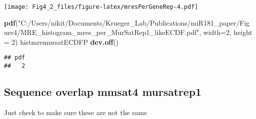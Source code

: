 \documentclass[
]{article}
\newenvironment{Shaded}{\begin{snugshade}}{\end{snugshade}}
\newcommand{\AttributeTok}[1]{\textcolor[rgb]{0.13,0.29,0.53}{#1}}
\newcommand{\DecValTok}[1]{\textcolor[rgb]{0.00,0.00,0.81}{#1}}
\newcommand{\FunctionTok}[1]{\textcolor[rgb]{0.13,0.29,0.53}{\textbf{#1}}}
\newcommand{\NormalTok}[1]{#1}
\newcommand{\StringTok}[1]{\textcolor[rgb]{0.31,0.60,0.02}{#1}}
\begin{document}
\texttt{[image: Fig4\_2\_files/figure-latex/mresPerGeneRep-4.pdf]}

\begin{Shaded}
\begin{Highlighting}[]
\FunctionTok{pdf}\NormalTok{(}\StringTok{"C:/Users/nikit/Documents/Krueger\_Lab/Publications/miR181\_paper/Figure4/MRE\_histogram\_mres\_per\_MurSatRep1\_likeECDF.pdf"}\NormalTok{, }\AttributeTok{width=}\DecValTok{2}\NormalTok{, }\AttributeTok{height =} \DecValTok{2}\NormalTok{)}
\NormalTok{histmremursatECDFP}
\FunctionTok{dev.off}\NormalTok{()}
\end{Highlighting}
\end{Shaded}

\begin{verbatim}
## pdf 
##   2
\end{verbatim}

\hypertarget{sequence-overlap-mmsat4-mursatrep1}{%
\subsection{Sequence overlap mmsat4
mursatrep1}\label{sequence-overlap-mmsat4-mursatrep1}}

Just check to make sure these are not the same
\end{document}
